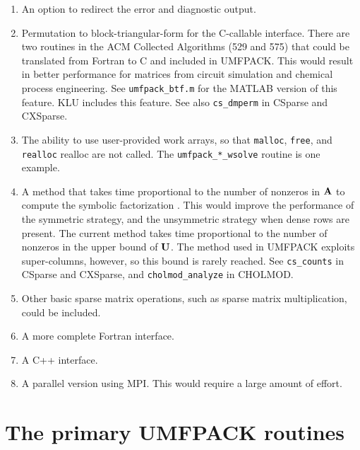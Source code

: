 \documentclass[11pt]{article}
\newcommand{\m}[1]{{\bf{#1}}}       %
\begin{document}
\begin{enumerate}
\item An option to redirect the error and diagnostic output.

\item Permutation to block-triangular-form \cite{Duff78a} for the C-callable
    interface.  There are two routines in the ACM Collected
    Algorithms (529 and 575) \cite{Duff81b,Duff78b}
    that could be translated from Fortran
    to C and included in UMFPACK.  This would result in better performance
    for matrices from circuit simulation and
    chemical process engineering.  See {\tt umfpack\_btf.m} for the MATLAB
    version of this feature.  KLU includes this feature.
    See also {\tt cs\_dmperm} in CSparse and CXSparse.

\item The ability to use user-provided work arrays, so that {\tt malloc},
    {\tt free}, and {\tt realloc} realloc are not called.  The
    {\tt umfpack\_*\_wsolve} routine is one example.

\item A method that takes time proportional to the number of nonzeros in
    $\m{A}$ to compute the symbolic factorization \cite{GilbertNgPeyton94}.
    This would improve the performance of the symmetric strategy,
    and the unsymmetric strategy when dense rows are present.
    The current method takes
    time proportional to the number of nonzeros in the upper bound of $\m{U}$.
    The method used in UMFPACK exploits super-columns, however, so this
    bound is rarely reached.
    See {\tt cs\_counts} in CSparse and CXSparse,
    and {\tt cholmod\_analyze} in CHOLMOD.

\item Other basic sparse matrix operations, such as sparse matrix
    multiplication, could be included.

\item A more complete Fortran interface.

\item A C++ interface.

\item A parallel version using MPI.  This would require a large amount
    of effort.

\end{enumerate}


\newpage
\section{The primary UMFPACK routines}
\label{Primary}
\end{document}
